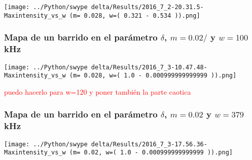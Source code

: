 				\begin{minipage}{0.6\textwidth}
					\centering
					\texttt{[image: ../Python/swype delta/Results/2016\_7\_2-20.31.5-Maxintensity\_vs\_w (m= 0.028, w=( 0.321 - 0.534 )).png]}
				\end{minipage}	
		
		
	\subsubsection{Mapa de un barrido en el parámetro $\delta$, $m=0.02/$ y $w=100$kHz}
		
			\begin{minipage}{0.6\textwidth}
				\centering
				\texttt{[image: ../Python/swype delta/Results/2016\_7\_3-10.47.48-Maxintensity\_vs\_w (m= 0.028, w=( 1.0 - 0.000999999999999 )).png]}
			\end{minipage}
		\textcolor{red}{puedo hacerlo para w=120 y poner también la parte caotica}
				

		\subsubsection{Mapa de un barrido en el parámetro $\delta$, $m=0.02$ y $w=379$kHz}
				
				\begin{minipage}{0.6\textwidth}
					\centering
					\texttt{[image: ../Python/swype delta/Results/2016\_7\_3-17.56.36-Maxintensity\_vs\_w (m= 0.02, w=( 1.0 - 0.000999999999999 )).png]}
				\end{minipage}	
				